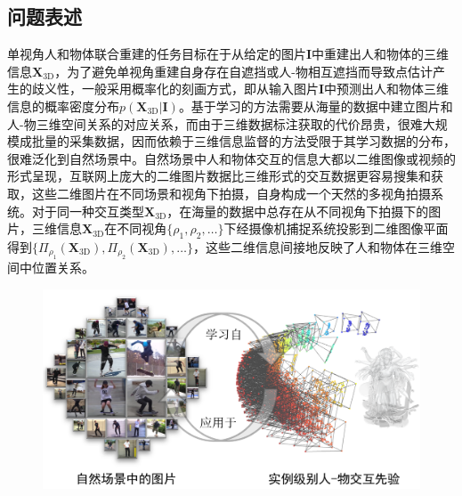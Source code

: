 \subsection{问题表述}
单视角人和物体联合重建的任务目标在于从给定的图片$\mathbf{I}$中重建出人和物体的三维信息$\mathbf{X}_{\text{3D}}$，为了避免单视角重建自身存在自遮挡或人-物相互遮挡而导致点估计产生的歧义性，一般采用概率化的刻画方式，即从输入图片$\mathbf{I}$中预测出人和物体三维信息的概率密度分布$p(\mathbf{X}_{\text{3D}}|\mathbf{I})$。基于学习的方法需要从海量的数据中建立图片和人-物三维空间关系的对应关系，而由于三维数据标注获取的代价昂贵，很难大规模成批量的采集数据，因而依赖于三维信息监督的方法受限于其学习数据的分布，很难泛化到自然场景中。自然场景中人和物体交互的信息大都以二维图像或视频的形式呈现，互联网上庞大的二维图片数据比三维形式的交互数据更容易搜集和获取，这些二维图片在不同场景和视角下拍摄，自身构成一个天然的多视角拍摄系统。对于同一种交互类型$\mathbf{X}_{\text{3D}}$，在海量的数据中总存在从不同视角下拍摄下的图片，三维信息$\mathbf{X}_{\text{3D}}$在不同视角$\{\rho_1, \rho_2, \dots\}$下经摄像机捕捉系统投影到二维图像平面得到$\{\Pi_{\rho_1}(\mathbf{X}_{\text{3D}}), \Pi_{\rho_2}(\mathbf{X}_{\text{3D}}), \dots\}$，这些二维信息间接地反映了人和物体在三维空间中位置关系。

\begin{figure}[!htbp]
	\centering
	\includegraphics[width=0.8\linewidth]{Img/intro_2d_prior}
	\label{fig:intro-2d-prior}
\end{figure}

